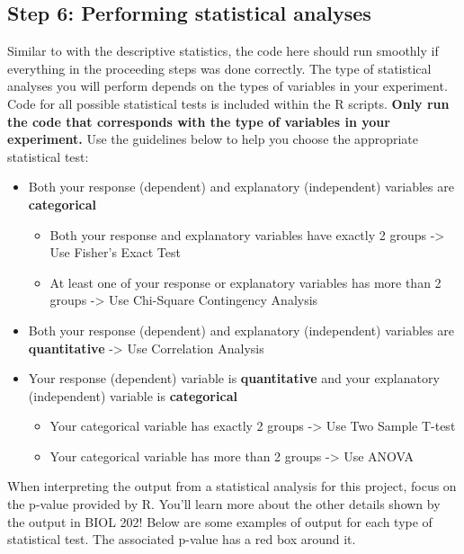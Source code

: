 \documentclass[
]{book}
\providecommand{\tightlist}{%
  \setlength{\itemsep}{0pt}\setlength{\parskip}{0pt}}
\begin{document}
\hypertarget{step-6-performing-statistical-analyses}{%
\subsection*{Step 6: Performing statistical analyses}\label{step-6-performing-statistical-analyses}}

Similar to with the descriptive statistics, the code here should run smoothly if everything in the proceeding steps was done correctly. The type of statistical analyses you will perform depends on the types of variables in your experiment. Code for all possible statistical tests is included within the R scripts. \textbf{Only run the code that corresponds with the type of variables in your experiment.} Use the guidelines below to help you choose the appropriate statistical test:

\begin{itemize}
\tightlist
\item
  Both your response (dependent) and explanatory (independent) variables are \textbf{categorical}

  \begin{itemize}
  \tightlist
  \item
    Both your response and explanatory variables have exactly 2 groups -\textgreater{} Use Fisher's Exact Test
  \item
    At least one of your response or explanatory variables has more than 2 groups -\textgreater{} Use Chi-Square Contingency Analysis
  \end{itemize}
\item
  Both your response (dependent) and explanatory (independent) variables are \textbf{quantitative} -\textgreater{} Use Correlation Analysis
\item
  Your response (dependent) variable is \textbf{quantitative} and your explanatory (independent) variable is \textbf{categorical}

  \begin{itemize}
  \tightlist
  \item
    Your categorical variable has exactly 2 groups -\textgreater{} Use Two Sample T-test
  \item
    Your categorical variable has more than 2 groups -\textgreater{} Use ANOVA
  \end{itemize}
\end{itemize}

When interpreting the output from a statistical analysis for this project, focus on the p-value provided by R. You'll learn more about the other details shown by the output in BIOL 202! Below are some examples of output for each type of statistical test. The associated p-value has a red box around it.
\end{document}
